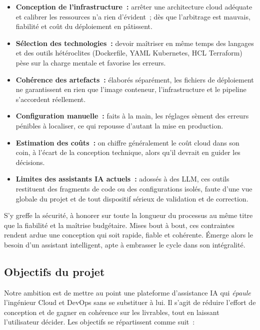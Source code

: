 \begin{itemize}
    \item \textbf{Conception de l'infrastructure~:} arrêter une architecture cloud adéquate
    et calibrer les ressources n'a rien d'évident~; dès que l'arbitrage est mauvais, fiabilité
    et coût du déploiement en pâtissent.
    \item \textbf{Sélection des technologies~:} devoir maîtriser en même temps des langages
    et des outils hétéroclites (Dockerfile, YAML Kubernetes, HCL Terraform) pèse sur la
    charge mentale et favorise les erreurs.
    \item \textbf{Cohérence des artefacts~:} élaborés séparément, les fichiers de déploiement
    ne garantissent en rien que l'image conteneur, l'infrastructure et le pipeline s'accordent
    réellement.
    \item \textbf{Configuration manuelle~:} faits à la main, les réglages sèment des erreurs
    pénibles à localiser, ce qui repousse d'autant la mise en production.
    \item \textbf{Estimation des coûts~:} on chiffre généralement le coût cloud dans son coin,
    à l'écart de la conception technique, alors qu'il devrait en guider les décisions.
    \item \textbf{Limites des assistants IA actuels~:} adossés à des LLM, ces outils
    restituent des fragments de code ou des configurations isolés, faute d'une vue globale du
    projet et de tout dispositif sérieux de validation et de correction.
\end{itemize}

S'y greffe la sécurité, à honorer sur toute la longueur du processus au même titre que la
fiabilité et la maîtrise budgétaire. Mises bout à bout, ces contraintes rendent ardue une
conception qui soit rapide, fiable et cohérente. Émerge alors le besoin d'un assistant
intelligent, apte à embrasser le cycle dans son intégralité.

\subsection{Objectifs du projet}
Notre ambition est de mettre au point une plateforme d'assistance IA qui \emph{épaule}
l'ingénieur Cloud et DevOps sans se substituer à lui. Il s'agit de réduire l'effort de
conception et de gagner en cohérence sur les livrables, tout en laissant l'utilisateur
décider. Les objectifs se répartissent comme suit~:

